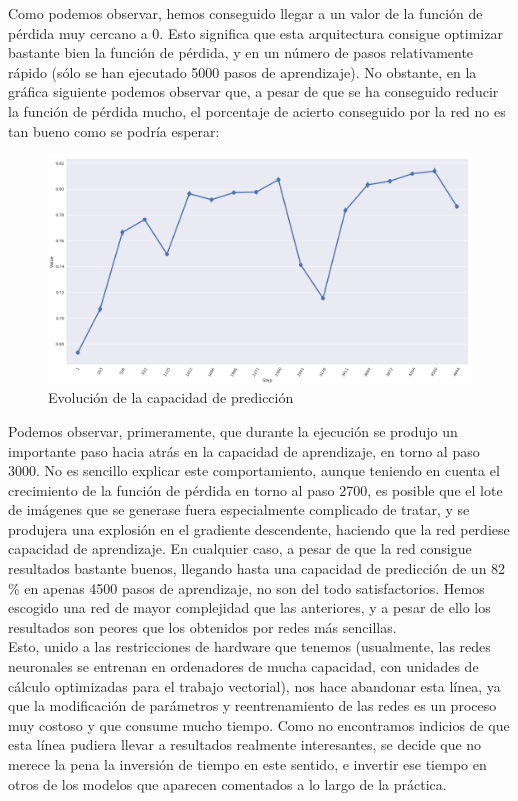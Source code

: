 \documentclass[11pt]{article}
\theoremstyle{plain}
\theoremstyle{definition}
\begin{document}
Como podemos observar, hemos conseguido llegar a un valor de la
función de pérdida muy cercano a 0. Esto significa que esta
arquitectura consigue optimizar bastante bien la función de pérdida, y
en un número de pasos relativamente rápido (sólo se han ejecutado 5000
pasos de aprendizaje).  No obstante, en la gráfica siguiente podemos
observar que, a pesar de que se ha conseguido reducir la función de
pérdida mucho, el porcentaje de acierto conseguido por la red no es
tan bueno como se podría esperar:

\begin{figure}[H]
  \centering
  \includegraphics[width=.95\textwidth]{imgs/accuracy_2conv}
  \caption{Evolución de la capacidad de predicción}
\end{figure}

Podemos observar, primeramente, que durante la ejecución se produjo un
importante paso hacia atrás en la capacidad de aprendizaje, en torno
al paso 3000. No es sencillo explicar este comportamiento, aunque
teniendo en cuenta el crecimiento de la función de pérdida en torno al
paso 2700, es posible que el lote de imágenes que se generase fuera
especialmente complicado de tratar, y se produjera una explosión en el
gradiente descendente, haciendo que la red perdiese capacidad de
aprendizaje. En cualquier caso, a pesar de que la red consigue
resultados bastante buenos, llegando hasta una capacidad de predicción
de un 82 \% en apenas 4500 pasos de aprendizaje, no son del todo
satisfactorios. Hemos escogido una red de mayor complejidad que las
anteriores, y a pesar de ello los resultados son peores que los
obtenidos por redes más sencillas.\\

Esto, unido a las restricciones de hardware que tenemos (usualmente,
las redes neuronales se entrenan en ordenadores de mucha capacidad,
con unidades de cálculo optimizadas para el trabajo vectorial), nos
hace abandonar esta línea, ya que la modificación de parámetros y
reentrenamiento de las redes es un proceso muy costoso y que consume
mucho tiempo. Como no encontramos indicios de que esta línea pudiera
llevar a resultados realmente interesantes, se decide que no merece la
pena la inversión de tiempo en este sentido, e invertir ese tiempo en
otros de los modelos que aparecen comentados a lo largo de la
práctica.
\end{document}
